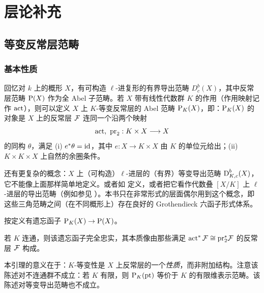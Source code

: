 
\appendix

\section{层论补充}\label{App}

\subsection{等变反常层范畴}

\subsubsection{基本性质}
回忆对 $k$ 上的概形 $X$，有可构造 $\ell$-进复形的有界导出范畴 $D_c^b(X)$，其中反常层范畴 $\operatorname{P}(X)$ 作为全 Abel 子范畴。若 $X$ 带有线性代数群 $K$ 的作用（作用映射记作 $\operatorname{act}$），则可以定义 $X$ 上 $K$-等变反常层的 Abel 范畴 $\operatorname{P}_K(X)$，即：$\operatorname{P}_K(X)$ 的对象是 $X$ 上的反常层 ${\mathcal F}$ 连同一个沿两个映射
\[\operatorname{act},\ {\operatorname{pr}}_2:K\times X\longrightarrow X\]
的同构 $\theta$，满足 (i) $e^*\theta={\operatorname{id}}$，其中 $e:X\to K\times X$ 由 $K$ 的单位元给出；(ii) $K\times K\times X$ 上自然的余圈条件。

\begin{rmk}
还有更复杂的概念：$X$ 上（可构造）$\ell$-进层的（有界）等变导出范畴 $\operatorname{D}_{K,c}^b(X)$，它不能像上面那样简单地定义。或者如 \cite{BeLu} 定义，或者把它看作代数叠 $[X/K]$ 上 $\ell$-进层的导出范畴（例如参见 \cite{LZ}）。本书只在非常形式的层面偶尔用到这个概念，即这些三角范畴之间（在不同概形上）存在良好的 Grothendieck 六函子形式体系。
\end{rmk}

按定义有遗忘函子 $\operatorname{P}_K(X)\to \operatorname{P}(X)$。

\begin{lem}\label{A:forgetful}
若 $K$ 连通，则该遗忘函子完全忠实，其本质像由那些满足 $\operatorname{act}^*{\mathcal F}\cong{\operatorname{pr}}_2^*{\mathcal F}$ 的反常层 ${\mathcal F}$ 构成。
\end{lem}

本引理的意义在于：$K$-等变性是 $X$ 上反常层的一个\emph{性质}，而非附加结构。注意该陈述对不连通群不成立：若 $K$ 有限，则 $\operatorname{P}_K(\operatorname{pt})$ 等价于 $K$ 的有限维表示范畴。该陈述对等变导出范畴也不成立。

